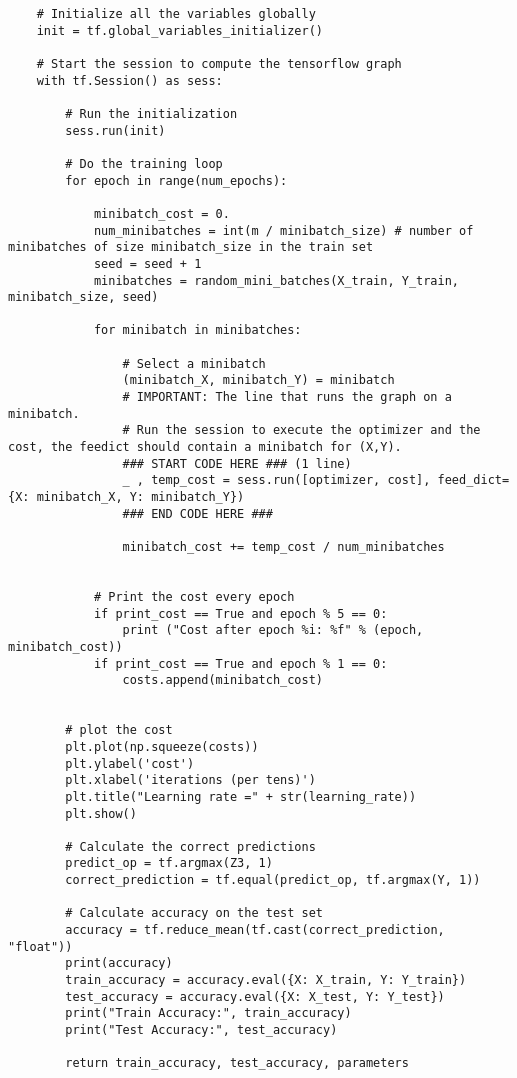\begin{verbatim}
    # Initialize all the variables globally
    init = tf.global_variables_initializer()
     
    # Start the session to compute the tensorflow graph
    with tf.Session() as sess:
        
        # Run the initialization
        sess.run(init)
        
        # Do the training loop
        for epoch in range(num_epochs):

            minibatch_cost = 0.
            num_minibatches = int(m / minibatch_size) # number of minibatches of size minibatch_size in the train set
            seed = seed + 1
            minibatches = random_mini_batches(X_train, Y_train, minibatch_size, seed)

            for minibatch in minibatches:

                # Select a minibatch
                (minibatch_X, minibatch_Y) = minibatch
                # IMPORTANT: The line that runs the graph on a minibatch.
                # Run the session to execute the optimizer and the cost, the feedict should contain a minibatch for (X,Y).
                ### START CODE HERE ### (1 line)
                _ , temp_cost = sess.run([optimizer, cost], feed_dict={X: minibatch_X, Y: minibatch_Y})
                ### END CODE HERE ###
                
                minibatch_cost += temp_cost / num_minibatches
                

            # Print the cost every epoch
            if print_cost == True and epoch % 5 == 0:
                print ("Cost after epoch %i: %f" % (epoch, minibatch_cost))
            if print_cost == True and epoch % 1 == 0:
                costs.append(minibatch_cost)
        
        
        # plot the cost
        plt.plot(np.squeeze(costs))
        plt.ylabel('cost')
        plt.xlabel('iterations (per tens)')
        plt.title("Learning rate =" + str(learning_rate))
        plt.show()

        # Calculate the correct predictions
        predict_op = tf.argmax(Z3, 1)
        correct_prediction = tf.equal(predict_op, tf.argmax(Y, 1))
        
        # Calculate accuracy on the test set
        accuracy = tf.reduce_mean(tf.cast(correct_prediction, "float"))
        print(accuracy)
        train_accuracy = accuracy.eval({X: X_train, Y: Y_train})
        test_accuracy = accuracy.eval({X: X_test, Y: Y_test})
        print("Train Accuracy:", train_accuracy)
        print("Test Accuracy:", test_accuracy)
                
        return train_accuracy, test_accuracy, parameters
\end{verbatim}

